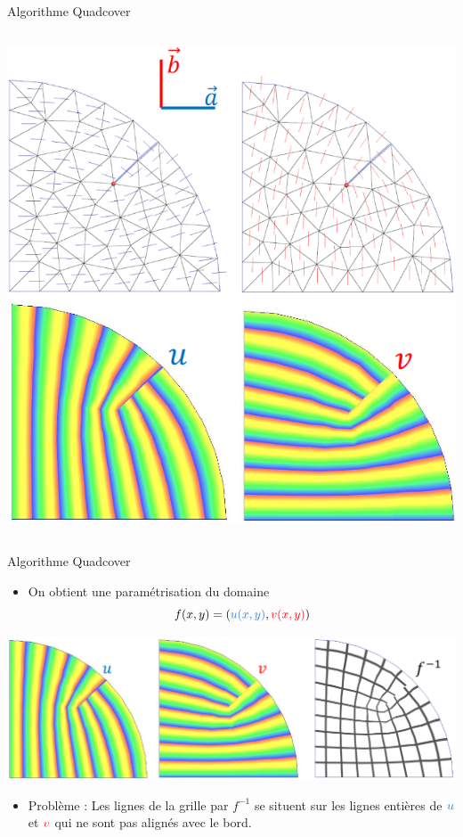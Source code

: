 \begin{frame}{Algorithme Quadcover}
\begin{columns}
        \begin{column}{0.5\textwidth}
            \centering
            \includegraphics[width=\linewidth]{img/new_images/vf_to_sf.png}
        \end{column}
    \end{columns}
\end{frame}



\begin{frame}{Algorithme Quadcover}
    \centering
    \begin{itemize}
        \item On obtient une paramétrisation du domaine \[f(x,y) = (\blue{u(x,y)}, \red{v(x,y)})\]
    \end{itemize}
    
    \includegraphics[width=\linewidth]{img/new_images/u_v_forme_f.png}
    \vspace{-1em}
    \begin{itemize}
        \item Problème : Les lignes de la grille par $f^{-1}$ se situent sur les lignes entières de $\blue{u}$ et ${\color{red}v}$
        qui ne sont pas alignés avec le bord.
    \end{itemize}
\end{frame}

